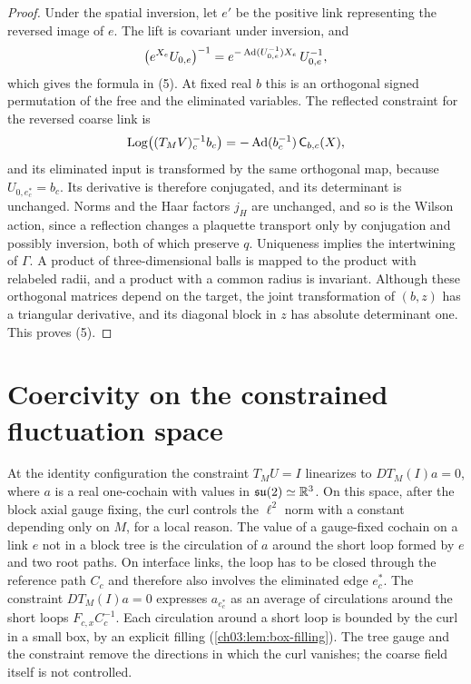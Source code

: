 \begin{proof}
Under the spatial inversion, let $e'$ be the positive link representing the reversed image of $e$. The lift is covariant under inversion, and
\[
 \bigl(e^{X_e}U_{0,e}\bigr)^{-1}=e^{-\operatorname{Ad}(U_{0,e}^{-1})X_e}\,U_{0,e}^{-1},
\]
which gives the formula in (5). At fixed real $b$ this is an orthogonal signed permutation of the free and the eliminated variables. The reflected constraint for the reversed coarse link is
\[
 \operatorname{Log}\bigl((T_MV)_c^{-1}b_c\bigr)=-\operatorname{Ad}(b_c^{-1})\,\mathsf C_{b,c}(X),
\]
and its eliminated input is transformed by the same orthogonal map, because $U_{0,e^*_c}=b_c$. Its derivative is therefore conjugated, and its determinant is unchanged. Norms and the Haar factors $j_H$ are unchanged, and so is the Wilson action, since a reflection changes a plaquette transport only by conjugation and possibly inversion, both of which preserve $q$. Uniqueness implies the intertwining of $\Gamma$. A product of three-dimensional balls is mapped to the product with relabeled radii, and a product with a common radius is invariant. Although these orthogonal matrices depend on the target, the joint transformation of $(b,z)$ has a triangular derivative, and its diagonal block in $z$ has absolute determinant one. This proves (5).
\end{proof}

\section{Coercivity on the constrained fluctuation space}\label{ch03:sec:coercivity}

At the identity configuration the constraint $T_MU=I$ linearizes to $DT_M(I)a=0$, where $a$ is a real one-cochain with values in $\mathfrak{su}(2)\simeq\mathbb R^3$. On this space, after the block axial gauge fixing, the curl controls the $\ell^2$ norm with a constant depending only on $M$, for a local reason. The value of a gauge-fixed cochain on a link $e$ not in a block tree is the circulation of $a$ around the short loop formed by $e$ and two root paths. On interface links, the loop has to be closed through the reference path $C_c$ and therefore also involves the eliminated edge $e^*_c$. The constraint $DT_M(I)a=0$ expresses $a_{e^*_c}$ as an average of circulations around the short loops $F_{c,x}C_c^{-1}$. Each circulation around a short loop is bounded by the curl in a small box, by an explicit filling (\cref{ch03:lem:box-filling}). The tree gauge and the constraint remove the directions in which the curl vanishes; the coarse field itself is not controlled.

